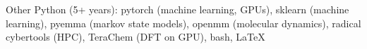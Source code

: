 
\begin{rubric}{Other}
\noentry{}
	Python (5+ years): pytorch (machine learning, GPUs), sklearn (machine learning), pyemma (markov state models), openmm (molecular dynamics), radical cybertools (HPC), TeraChem (DFT on GPU), bash, \LaTeX
\end{rubric}

